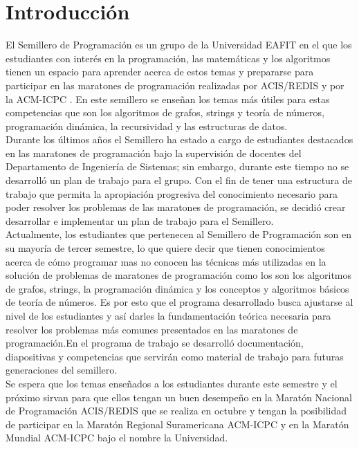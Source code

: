 \documentclass[conference]{IEEEtran}
\begin{document}
\section{Introducción}
El Semillero de Programación es un grupo de la Universidad EAFIT en el que los estudiantes con interés en la programación, las matemáticas y los algoritmos tienen un espacio para aprender acerca de estos temas y prepararse para participar en las maratones de programación realizadas por ACIS/REDIS \cite{ACIS} y por la ACM-ICPC \cite{ICPC}. En este semillero se enseñan los temas más útiles \cite{ProgrammingChallenges, Halim, Halim2, Brasil} para estas competencias que son los algoritmos de grafos, strings y teoría de números, programación dinámica, la recursividad y las estructuras de datos.\\
Durante los últimos años el Semillero ha estado a cargo de estudiantes destacados en las maratones de programación bajo la supervisión de docentes del Departamento de Ingeniería de Sistemas; sin embargo, durante este tiempo no se desarrolló un plan de trabajo para el grupo. Con el fin de tener una estructura de trabajo que permita la apropiación progresiva del conocimiento necesario para poder resolver los problemas de las maratones de programación, se decidió crear desarrollar e implementar un plan de trabajo para el Semillero.\\
Actualmente, los estudiantes que pertenecen al Semillero de Programación son en su mayoría de tercer semestre, lo que quiere decir que tienen conocimientos acerca de cómo programar mas no conocen las técnicas más utilizadas en la solución de problemas de maratones de programación como los son los algoritmos de grafos, strings, la programación dinámica y los conceptos y algoritmos básicos de teoría de números. Es por esto que el programa desarrollado busca ajustarse al nivel de los estudiantes y así darles la fundamentación teórica necesaria para resolver los problemas más comunes presentados en las maratones de programación.En el programa de trabajo se desarrolló documentación, diapositivas y competencias que servirán como material de trabajo para futuras generaciones del semillero.\\
Se espera que los temas enseñados a los estudiantes durante este semestre y el próximo sirvan para que ellos tengan un buen desempeño en la Maratón Nacional de Programación ACIS/REDIS que se realiza en octubre y tengan la posibilidad de participar en la Maratón Regional Suramericana ACM-ICPC y en la Maratón Mundial ACM-ICPC bajo el nombre la Universidad.
\end{document}
